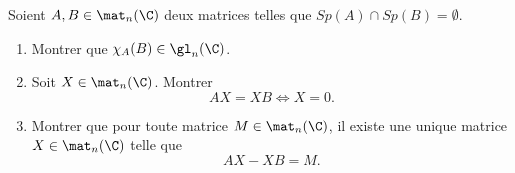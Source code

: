 \begin{enonce}
\begin{exercise}[ID={RMS127 E690},subtitle={Mines-Ponts PSI 2016},tags={}, difficulty={0}]
  Soient $A,B\in\mat_n(\C)$ deux matrices telles que $Sp(A)\cap Sp(B)=\emptyset$.
  \begin{enumerate}
    \item Montrer que $\chi_A(B) \in\gl_n(\C)$.
    \item Soit $X\in\mat_n(\C)$.  Montrer 
      \begin{equation*}
        AX=XB \iff X=0.
      \end{equation*}
    \item Montrer que pour toute matrice $M\in\mat_n(\C)$, il existe une unique matrice $X\in\mat_n(\C)$ telle que 
      \begin{equation*} AX - XB = M.\end{equation*}
  \end{enumerate}
\end{exercise}
\begin{solution}
\end{solution}
\end{enonce}
